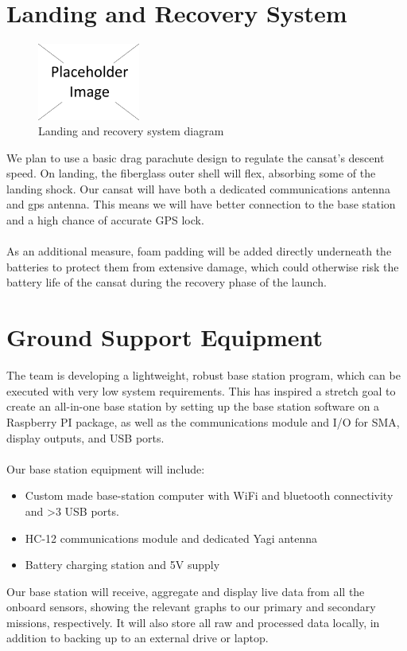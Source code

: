 \documentclass{report}
\begin{document}
	\section{Landing and Recovery System}

		\begin{figure}
			\vspace{-30pt}
	 		\begin{center}
			\includegraphics[width=0.30\textwidth]{placeholder}
			\end{center}
			\vspace{-15pt}
			\caption[X]{Landing and recovery system diagram}
		\end{figure}

		We plan to use a basic drag parachute design to regulate the cansat’s 
		descent speed. On landing, the fiberglass outer shell will flex, absorbing 
		some of the landing shock. Our cansat will have both a dedicated
		communications antenna and gps antenna. This means we will have 
		better connection to the base station and a high chance of accurate GPS lock.
		\\\\
		{\color{blue}As an additional measure, foam padding will be added 
		directly underneath the batteries to protect them from extensive damage, which
		could otherwise risk the battery life of the cansat during the recovery phase of
		the launch.}

	\section{Ground Support Equipment}
		The team is developing a lightweight, robust base station program, which 
		can be executed with very low system requirements. This has inspired a
		stretch goal to create an all-in-one base station by setting up the base 
		station software on a Raspberry PI package, as well as the communications
		module and I/O for SMA, display outputs, and USB ports.
		\\\\
		Our base station equipment will include:
		\begin{itemize}
			\item Custom made base-station computer with WiFi and bluetooth
			connectivity and >3 USB ports.
			\item HC-12 communications module and dedicated Yagi antenna
			\item Battery charging station and 5V supply
		\end{itemize}
		Our base station will receive, aggregate and display live data
		from all the onboard sensors, showing the relevant graphs to our primary
		and secondary missions, respectively. It will also store all raw and 
		processed data locally, in addition to backing up to an external drive or 
		laptop.
	
\end{document}
